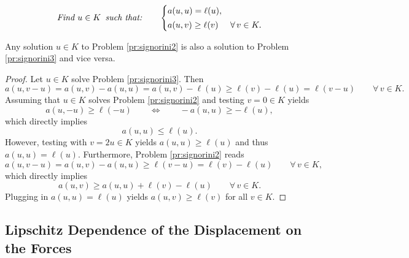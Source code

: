 \begin{problem}\label{pr:signorini3}
\begin{equation*}
	\text{\em Find } u\in K\text{\em\enspace such that:}\qquad\begin{cases}
		a(u,u) = \ell(u), &                   \\[2pt]
		a(u,v)\ge \ell(v) & \forall\, v\in K.
	\end{cases}
\end{equation*}
\end{problem}

\begin{proposition}\label{pr:equivalence23}
	Any solution $u\in K$ to Problem \ref{pr:signorini2} is also a solution to Problem \ref{pr:signorini3} and vice versa.
\end{proposition}
\begin{proof}
	Let $u\in K$ solve Problem \ref{pr:signorini3}. Then
	\begin{equation*}
		a(u,v-u) = a(u,v)-a(u,u)  = a(u,v)-\ell(u)\ge \ell(v)-\ell(u) = \ell(v-u)\qquad\forall\,v\in K.
	\end{equation*}
	Assuming that $u\in K$ solves Problem \ref{pr:signorini2} and testing $v=0\in K$ yields
	\begin{equation*}
		a(u,-u)\ge \ell(-u)\qquad\Longleftrightarrow\qquad -a(u,u)\ge -\ell(u),
	\end{equation*}
	which directly implies
	\begin{equation*}
		a(u,u)\le \ell(u).
	\end{equation*}
	However, testing with $v=2u\in K$ yields $a(u,u)\ge \ell(u)$ and thus $a(u,u) = \ell(u)$. Furthermore, Problem \ref{pr:signorini2} reads
	\begin{equation*}
		a(u,v-u) = a(u,v)-a(u,u)\ge \ell(v-u) = \ell(v)-\ell(u)\qquad\forall\,v\in K,
	\end{equation*}
	which directly implies
	\begin{equation*}
		a(u,v)\ge a(u,u)+\ell(v)-\ell(u)\qquad\forall\,v\in K.
	\end{equation*}
	Plugging in $a(u,u) = \ell(u)$ yields $a(u,v)\ge \ell(v)$ for all $v\in K$.
\end{proof}

\subsection{Lipschitz Dependence of the Displacement on the Forces}

